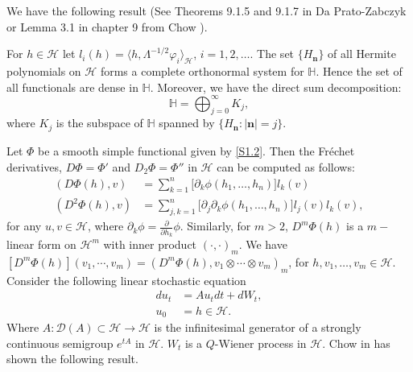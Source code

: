 \documentclass[review, onefignum, onetabnum]{siamart171218}
\begin{document}
    We have the following result (See Theorems 9.1.5 and 9.1.7 in Da
Prato-Zabczyk \cite{da-za} or Lemma 3.1 in chapter 9 from Chow \cite{liu}).

\begin{lemma}\label{s1.le1}
     For $h\in\mathcal{H}  $ let $l_i(h)=\langle h,  \Lambda^{-1/2}\varphi_i
    \rangle_\mathcal{H}$, $ i=1,2,\ldots$. The set $\{H_{\bm{n}}\}$ of all
    Hermite polynomials on $\mathcal{H} $ forms a complete orthonormal system
    for $\mathbb{H} $. Hence the set of all functionals are dense in
    $\mathbb{H}$. Moreover, we have the direct sum decomposition:
     \[
        \mathbb{H} = \bigoplus_{j=0}^\infty K_j,
    \]
    where $K_j$ is the subspace of $\mathbb{H} $ spanned by $\{H_{\bm{n}}:
    |\bm{n}|=j\}$.

\end{lemma}
%
Let $\Phi$ be a smooth simple functional given by \eqref{S1.2}. Then the
Fr\'echet derivatives, $D \Phi = \Phi'$ and $D_2 \Phi = \Phi''$ in
$\mathcal{H}$ can be computed as follows:
\begin{equation}
    \label{s1.3}
    \begin{aligned}
        (D \Phi(h), v)
        &=
            \sum_{k=1}^n \big[\partial_k \phi(h_1,\ldots,h_n)\big]
            l_k(v)\nonumber
        \\
        (D^2 \Phi(h), v)
        &=
            \sum_{j,k=1}^n \big[\partial_j\partial_k
            \phi(h_1,\ldots,h_n)\big] l_j(v) l_k(v),
    \end{aligned}
\end{equation}
for any $u, v \in \mathcal{H}$, where
$\partial_k \phi= \frac{\partial}{\partial h_k} \phi$.
Similarly, for $m > 2$, $D^m \Phi(h)$ is a $m-$linear form on $\mathcal{H}^m$
with inner product $(\cdot,\cdot)_m$.
We have
$
%
    [D^m\Phi(h) ](v_1 , \cdots, v_m )
        = (D^m \Phi(h), v_1 \otimes \cdots \otimes v_m )_m
%
$,
for $h, v_1 , \ldots , v_m \in \mathcal{H}$.
Consider the following linear stochastic equation
\begin{align*}
    du_t&=Au_tdt+dW_t,\label{OU}\\
    u_0&=h\in \mathcal{H}.
\end{align*}
Where $A: \mathcal{D}(A) \subset \mathcal{H} \rightarrow \mathcal{H}$ is the
infinitesimal generator of a strongly continuous semigroup $e^{tA}$ in
$\mathcal{H}$. $W_t$ is a $Q$-Wiener process
in $\mathcal{H}$. Chow in \cite[Lemma 9.4.1]{liu} has shown the following
result.
\end{document}
